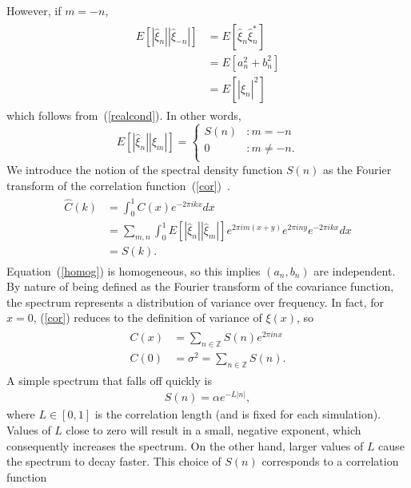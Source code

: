 However, if $m=-n$, 
\begin{align*}
\begin{split}
E[|\hat{\xi}_n||\hat{\xi}_{-n}|]&= E[\hat{\xi}_n\hat{\xi}_n^*]\\
&=E[a_n^2+b_n^2]\\
&=E[|\hat{\xi}_n|^2]
\end{split}
\end{align*}
which follows from~(\ref{realcond}). In other words,
\begin{displaymath}
E[|\hat{\xi}_n||\hat{\xi}_m|] = \left\{
     \begin{array}{lr}
       S(n) & : m = -n\\
       0 & : m \neq -n.\\
     \end{array}
   \right.
\end{displaymath} 
We introduce the notion of the spectral density function $S(n)$ as the Fourier transform
of the correlation function~(\ref{cor})~\cite{gelhar}.
\begin{align}
\begin{split}\label{homog}
\hat{C}(k) &= \int_{0}^{1}C(x)e^{-2\pi ikx}dx\\
&= \sum_{m,n} \int_{0}^{1} E[|\hat{\xi}_n||\hat{\xi}_m|] e^{2\pi
  im(x+y)}e^{2\pi iny}e^{-2\pi ikx}dx\\
&=S(k).
\end{split}
\end{align}
Equation~(\ref{homog}) is homogeneous, so this implies $(a_n,b_n)$ are
independent. By nature of being defined as the Fourier transform of
the covariance function, the spectrum represents a distribution of variance over
frequency. In fact, for $x=0$, (\ref{cor}) reduces to the definition
of variance of $\xi(x)$, so 
\begin{align*}
\begin{split}
C(x) &= \sum_{n\in \mathbb{Z}}S(n)e^{2\pi inx}\\
C(0) &= \sigma^2 = \sum_{n\in \mathbb{Z}}S(n).
\end{split}
\end{align*}
A simple spectrum that falls off quickly is
\begin{align}\label{spec}
S(n)=\alpha e^{-L|n|},
\end{align}
where $L \in [0,1]$ is the correlation length (and is fixed
for each simulation). Values of $L$ close to zero will result in a
small, negative exponent, which consequently increases the
spectrum. On the other hand, larger values of $L$ cause
the spectrum to decay faster. This choice of $S(n)$ corresponds to a correlation function
